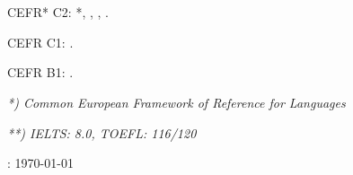 \documentclass[10pt,letterpaper]{article}
\renewenvironment{itemize}{
  \begin{list}{}{
    \setlength{\leftmargin}{1.5em}
    \setlength{\itemsep}{0.25em}
    \setlength{\parskip}{0pt}
    \setlength{\parsep}{0.25em}
  }
}{
  \end{list}
}
\begin{document}
\section*{\languages}


\begin{itemize}
\item CEFR* C2: \english  **, \danish, \norwegian, \german.
\item CEFR C1: \spanish.
\item CEFR B1: \portuguese.
\end{itemize}

\textit{*) Common European Framework of Reference for Languages}

\textit{**) IELTS: 8.0, TOEFL: 116/120}





\medskip

\begin{center}
  \begin{small}
    \lastupdated: \today
  \end{small}
\end{center}
\end{document}

